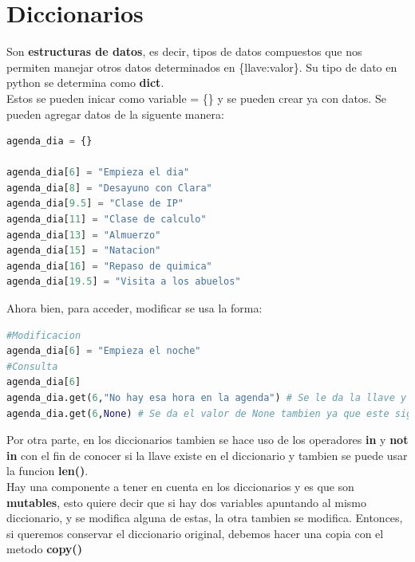 \documentclass{article}
\begin{document}
\section{Diccionarios}
Son \textbf{estructuras de datos}, es decir, tipos de datos compuestos que nos permiten manejar otros datos determinados en \{llave:valor\}. Su tipo de dato en python se determina como \textbf{dict}.\\
Estos se pueden inicar como variable = \{\} y se pueden crear ya con datos. Se pueden agregar datos de la siguente manera:
\begin{lstlisting}[language=Python, caption=Operacion adicion diccionario]
agenda_dia = {}

agenda_dia[6] = "Empieza el dia"
agenda_dia[8] = "Desayuno con Clara"
agenda_dia[9.5] = "Clase de IP"
agenda_dia[11] = "Clase de calculo"
agenda_dia[13] = "Almuerzo"
agenda_dia[15] = "Natacion"
agenda_dia[16] = "Repaso de quimica"
agenda_dia[19.5] = "Visita a los abuelos"

\end{lstlisting}
Ahora bien, para acceder, modificar se usa la forma: 
\begin{lstlisting}[language=Python, caption=Operacion modificacion y consulta diccionario]
#Modificacion
agenda_dia[6] = "Empieza el noche"
#Consulta
agenda_dia[6]
agenda_dia.get(6,"No hay esa hora en la agenda") # Se le da la llave y un valor si no existe
agenda_dia.get(6,None) # Se da el valor de None tambien ya que este significa ausencia de valor
\end{lstlisting}
Por otra parte, en los diccionarios tambien se hace uso de los operadores \textbf{in} y \textbf{not in} con el fin de conocer si la llave existe en el diccionario y tambien se puede usar la funcion \textbf{len()}.\\
Hay una componente a tener en cuenta en los diccionarios y es que son \textbf{mutables}, esto quiere decir que si hay dos variables apuntando al mismo diccionario, y se modifica alguna de estas, la otra tambien se modifica. Entonces, si queremos conservar el diccionario original, debemos hacer una copia con el metodo \textbf{copy()}
\end{document}
